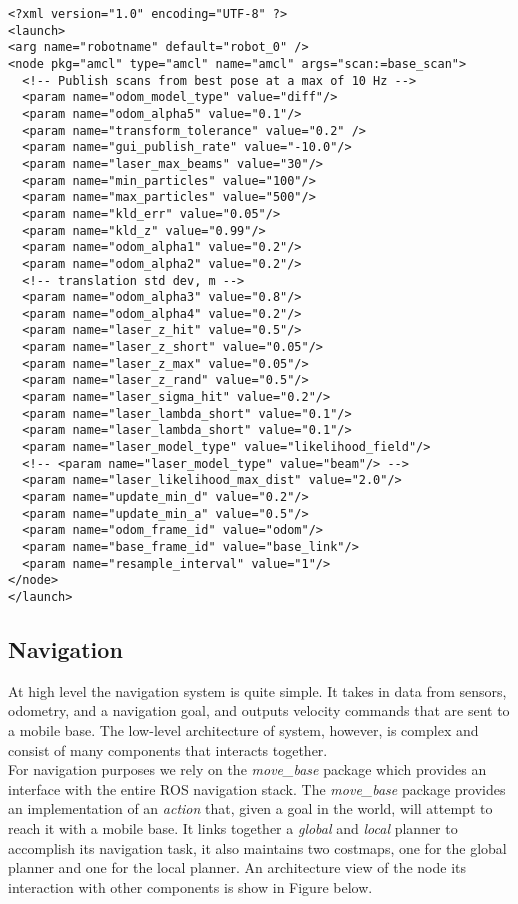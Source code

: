 \begin{lstlisting}
<?xml version="1.0" encoding="UTF-8" ?>
<launch>
<arg name="robotname" default="robot_0" />
<node pkg="amcl" type="amcl" name="amcl" args="scan:=base_scan">
  <!-- Publish scans from best pose at a max of 10 Hz -->
  <param name="odom_model_type" value="diff"/>
  <param name="odom_alpha5" value="0.1"/>
  <param name="transform_tolerance" value="0.2" />
  <param name="gui_publish_rate" value="-10.0"/>
  <param name="laser_max_beams" value="30"/>
  <param name="min_particles" value="100"/>
  <param name="max_particles" value="500"/>
  <param name="kld_err" value="0.05"/>
  <param name="kld_z" value="0.99"/>
  <param name="odom_alpha1" value="0.2"/>
  <param name="odom_alpha2" value="0.2"/>
  <!-- translation std dev, m -->
  <param name="odom_alpha3" value="0.8"/>
  <param name="odom_alpha4" value="0.2"/>
  <param name="laser_z_hit" value="0.5"/>
  <param name="laser_z_short" value="0.05"/>
  <param name="laser_z_max" value="0.05"/>
  <param name="laser_z_rand" value="0.5"/>
  <param name="laser_sigma_hit" value="0.2"/>
  <param name="laser_lambda_short" value="0.1"/>
  <param name="laser_lambda_short" value="0.1"/>
  <param name="laser_model_type" value="likelihood_field"/>
  <!-- <param name="laser_model_type" value="beam"/> -->
  <param name="laser_likelihood_max_dist" value="2.0"/>
  <param name="update_min_d" value="0.2"/>
  <param name="update_min_a" value="0.5"/>
  <param name="odom_frame_id" value="odom"/>
  <param name="base_frame_id" value="base_link"/>
  <param name="resample_interval" value="1"/>
</node>
</launch>
\end{lstlisting}

\subsection{Navigation}
At high level the navigation system is quite simple. It takes in data from sensors,
odometry, and a navigation goal, and outputs velocity commands that are sent to a 
mobile base. The low-level architecture of system, however, is complex and consist 
of many components that interacts together.
\\
For navigation purposes we rely on the \textit{move\_base} package which provides 
an interface with the entire ROS navigation stack. The \textit{move\_base} package
provides an implementation of an \textit{action} that, given a goal in the world,
will attempt to reach it with a mobile base. It links together a \textit{global} and 
\textit{local} planner to accomplish its navigation task, it also maintains two 
costmaps, one for the global planner and one for the local planner.
An architecture view of the node its interaction with other components is show in 
Figure below. %

